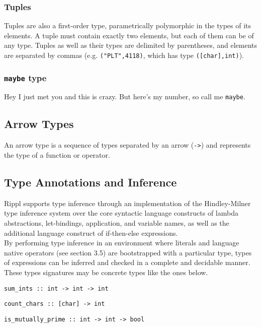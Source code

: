 \documentclass[5pt]{article}
\begin{document}
\subsubsection{Tuples}
Tuples are also a first-order type, parametrically polymorphic in the types of its elements. A tuple must contain exactly two elements, but each of them can be of any type. Tuples as well as their types are delimited by parentheses, and elements are separated by commas (e.g. \texttt{("PLT",4118)}, which has type \texttt{([char],int)}).

\subsubsection{\texttt{maybe} type}
Hey I just met you and this is crazy. But here's my number, so call me \texttt{maybe}.

\subsection{Arrow Types}
An arrow type is a sequence of types separated by an arrow (\texttt{->}) and represents the type of a function or operator. %

\subsection{Type Annotations and Inference}
Rippl supports type inference through an implementation of the Hindley-Milner type inference system over the core syntactic language constructs of lambda abstractions, let-bindings, application, and variable names, as well as the additional language construct of if-then-else expressions. \\

By performing type inference in an environment where literals and language native operators (see section 3.5) are bootstrapped  with a particular type, types of expressions can be inferred and checked in a complete and decidable manner. These types signatures may be concrete types like the ones below.

\begin{lstlisting}[language=rippl]
sum_ints :: int -> int -> int
\end{lstlisting}
\begin{lstlisting}[language=rippl]
count_chars :: [char] -> int
\end{lstlisting}
\begin{lstlisting}[language=rippl]
is_mutually_prime :: int -> int -> bool
\end{lstlisting}
\end{document}
